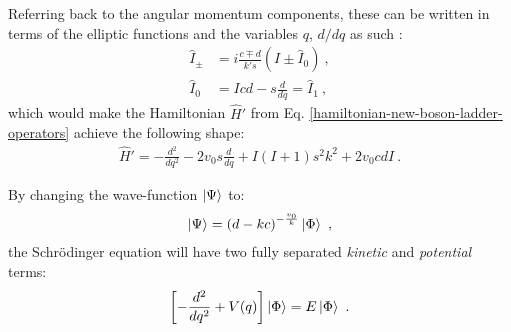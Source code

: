 Referring back to the angular momentum components, these can be written in terms of the elliptic functions and the variables $q$, $d/dq$ as such \cite{raduta2020new}:
\begin{align}
    \hat{I}_\pm&=i\frac{c\mp d}{k's}\left(I\pm\hat{I}_0\right)\ ,\nonumber\\
    \hat{I}_0&=Icd-s\frac{d}{dq}=\hat{I}_1\ ,
    \label{angular-momentum-elliptic-representation}
\end{align}
which would make the Hamiltonian $\hat{H}'$ from Eq. \ref{hamiltonian-new-boson-ladder-operators} achieve the following shape:
\begin{align}
    \hat{H}'=-\frac{d^2}{dq^2}-2v_0s\frac{d}{dq}+I(I+1)s^2k^2+2v_0cdI\ .
\end{align}

By changing the wave-function $\ket{\Psi}$ to:
\begin{align}
    \ket{\Psi}=\left(d-kc\right)^{-\frac{v_0}{k}}\ket{\Phi}\ ,
\end{align}
the Schrödinger equation will have two fully separated \emph{kinetic} and \emph{potential} terms:
\begin{align}
    \left[-\frac{d^2}{dq^2}+V(q)\right]\ket{\Phi}=E\ket{\Phi}\ .
\end{align}

